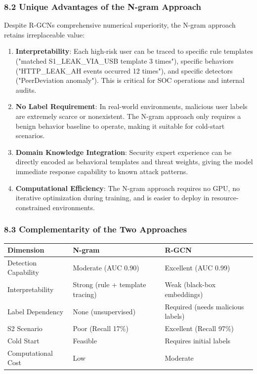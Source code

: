 \documentclass[
  a4paper,
  11pt]{article}
\newcounter{none} %
\begin{document}
\subsubsection{8.2 Unique Advantages of the N-gram
Approach}\label{82-unique-advantages-of-the-n-gram-approach}

Despite R-GCN\textquotesingle s comprehensive numerical superiority, the
N-gram approach retains irreplaceable value:

\begin{enumerate}
\def\labelenumi{\arabic{enumi}.}
\item
  \textbf{Interpretability}: Each high-risk user can be traced to
  specific rule templates ("matched S1\_LEAK\_VIA\_USB template 3
  times"), specific behaviors ("HTTP\_LEAK\_AH events occurred 12
  times"), and specific detectors ("PeerDeviation anomaly"). This is
  critical for SOC operations and internal audits.
\item
  \textbf{No Label Requirement}: In real-world environments, malicious
  user labels are extremely scarce or nonexistent. The N-gram approach
  only requires a benign behavior baseline to operate, making it
  suitable for cold-start scenarios.
\item
  \textbf{Domain Knowledge Integration}: Security expert experience can
  be directly encoded as behavioral templates and threat weights, giving
  the model immediate response capability to known attack patterns.
\item
  \textbf{Computational Efficiency}: The N-gram approach requires no
  GPU, no iterative optimization during training, and is easier to
  deploy in resource-constrained environments.
\end{enumerate}

\subsubsection{8.3 Complementarity of the Two
Approaches}\label{83-complementarity-of-the-two-approaches}

{\def\LTcaptype{none} %
\begin{longtable}[]{@{}lll@{}}
\toprule\noalign{}
Dimension & N-gram & R-GCN \\
\midrule\noalign{}
\endhead
\bottomrule\noalign{}
\endlastfoot
Detection Capability & Moderate (AUC 0.90) & Excellent (AUC 0.99) \\
Interpretability & Strong (rule + template tracing) & Weak (black-box
embeddings) \\
Label Dependency & None (unsupervised) & Required (needs malicious
labels) \\
S2 Scenario & Poor (Recall 17\%) & Excellent (Recall 97\%) \\
Cold Start & Feasible & Requires initial labels \\
Computational Cost & Low & Moderate \\
\end{longtable}
}
\end{document}
